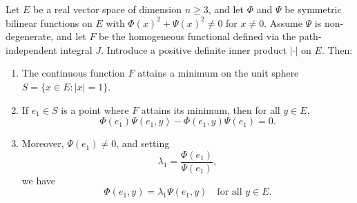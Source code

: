 Let $E$ be a real vector space of dimension $n \geq 3$, and let $\Phi$ and $\Psi$ be symmetric bilinear functions on $E$ with $\Phi(x)^2 + \Psi(x)^2 \neq 0$ for $x \neq 0$. Assume $\Psi$ is non-degenerate, and let $F$ be the homogeneous functional defined via the path-independent integral $J$. Introduce a positive definite inner product $|\cdot|$ on $E$. Then:
\begin{enumerate}
\item The continuous function $F$ attains a minimum on the unit sphere $S = \{x \in E : |x| = 1\}$.
\item If $e_1 \in S$ is a point where $F$ attains its minimum, then for all $y \in E$,
$$\Phi(e_1)\Psi(e_1, y) - \Phi(e_1, y)\Psi(e_1) = 0.$$
\item Moreover, $\Psi(e_1) \neq 0$, and setting
$$\lambda_1 = \frac{\Phi(e_1)}{\Psi(e_1)},$$
we have
$$\Phi(e_1, y) = \lambda_1 \Psi(e_1, y) \quad \text{for all } y \in E.$$
\end{enumerate}
